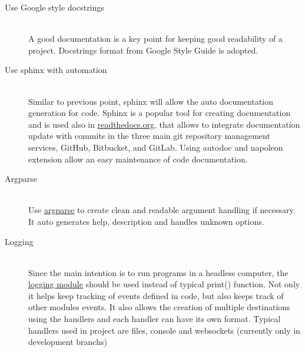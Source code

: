 \begin{description}
	\item[Use Google style docstrings] \hfill \\ A good documentation is a key point for keeping good readability of a project. Docstrings format from Google Style Guide \cite{python_google_style} is adopted.
	\item[Use sphinx with automation] \hfill \\ Similar to previous point, sphinx will allow the auto documentation generation for code. Sphinx is a popular tool for creating documentation and is used also in \href{https://readthedocs.org}{readthedocs.org}, that allows to integrate documentation update with commits in the three main git repository management services, GitHub, Bitbucket, and GitLab. Using autodoc and napoleon extension allow an easy maintenance of code documentation.
	\item[Argparse] \hfill \\ Use \href{https://docs.python.org/3/library/argparse.html}{argparse} to create clean and readable argument handling if necessary. It auto generates help, description and handles unknown options.
	\item[Logging] \hfill \\ Since the main intention is to run programs in a headless computer, the \href{https://docs.python.org/3/library/logging.html}{logging module} should be used instead of typical print() function. Not only it helps keep tracking of events defined in code, but also keeps track of other modules events. It also allows the creation of multiple destinations using the handlers and each handler can have its own format. Typical handlers used in project are files, console and websockets (currently only in development branchs)
\end{description}



 





